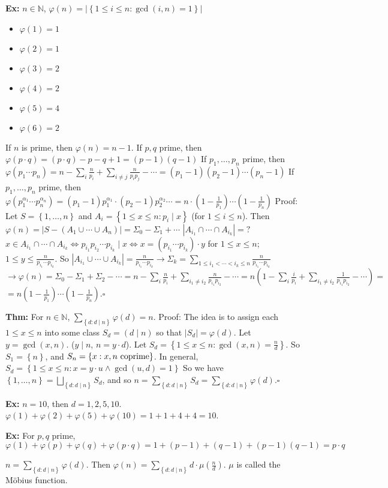 \documentclass[10pt,letterpaper]{article}
\newcommand{\n}{\hfill\break}
\newcommand{\thm}[1]{\par\noindent\settowidth{\hangindent}{\textbf{Thm: }}\textbf{Thm: }#1\n}
\newcommand{\ex}[1]{\par\noindent\settowidth{\hangindent}{\textbf{Ex: }}\textbf{Ex: }#1\n}
\newcommand{\proven}{\;$\square$\n}
\newcommand{\ptxt}[1]{\textrm{\textnormal{#1}}}
\newcommand{\card}[1]{\left|#1\right|}
\newcommand{\set}[1]{\left\{#1\right\}}
\newcommand{\naturals}{\mathbb{N}}
\newcommand{\N}{\naturals}
\newcommand{\divides}{\mid}
\begin{document}
\newpage
\ex{$n\in\N$, $\varphi(n)=\card{\set{1\le{}i\le{}n:\gcd(i,n)=1}}$\n
\begin{itemize}
	\item $\varphi(1)=1$
	\item $\varphi(2)=1$
	\item $\varphi(3)=2$
	\item $\varphi(4)=2$
	\item $\varphi(5)=4$
	\item $\varphi(6)=2$
\end{itemize}\n
If $n$ is prime, then $\varphi(n)=n-1$.\n
If $p,q$ prime, then $\varphi(p\cdot{}q)=(p\cdot{}q)-p-q+1=(p-1)(q-1)$\n
If $p_{1},\ldots,p_{n}$ prime, then $\varphi(p_{1}\cdots{}p_{n})=n-\sum_{i}\frac{n}{p_{i}}+\sum_{i\ne{}j}\frac{n}{p_{i}p_{j}}-\cdots=(p_{1}-1)(p_{2}-1)\cdots(p_{n}-1)$\n
If $p_{1},\ldots,p_{n}$ prime, then $\varphi(p_{1}^{\alpha_{1}}\cdots{}p_{n}^{\alpha_{n}})=(p_{1}-1)p_{1}^{\alpha_{1}}\cdot(p_{2}-1)p_{2}^{\alpha_{2}}\cdots=n\cdot\left(1-\frac{1}{p_{1}}\right)\cdots\left(1-\frac{1}{p_{n}}\right)$\n
\n
Proof: Let $S=\set{1,\ldots,n}$ and $A_{i}=\set{1\le{}x\le{}n:p_{i}\mid{}x}$ (for $1\le{}i\le{}n$).\n
Then $\varphi(n)=\card{S-(A_{1}\cup\cdots\cup{}A_{n})}=\Sigma_{0}-\Sigma_{1}+\cdots$\n
$\card{A_{i_{1}}\cap\cdots\cap{}A_{i_{k}}}=?$\n
$x\in{}A_{i_{1}}\cap\cdots\cap{}A_{i_{k}}\Leftrightarrow{}p_{i_{1}}p_{i_{2}}\cdots{}p_{i_{k}}\mid{}x\Leftrightarrow{}x=(p_{i_{1}}\cdots{}p_{i_{k}})\cdot{}y$ for $1\le{}x\le{}n$; $1\le{}y\le\frac{n}{p_{i_{1}}\cdots{}p_{i_{k}}}$.\n
So $\displaystyle\card{A_{i_{1}}\cup\cdots\cup{}A_{i_{k}}}=\frac{n}{p_{i_{1}}\cdots{}p_{i_{k}}}\to\Sigma_{k}=\sum_{1\le{}i_{1}<\cdots<i_{k}\le{}n}\frac{n}{p_{i_{1}}\cdots{}p_{i_{k}}}$\n
$\to\varphi(n)=\Sigma_{0}-\Sigma_{1}+\Sigma_{2}-\cdots=n-\sum_{i}\frac{n}{p_{i}}+\sum_{i_{1}\ne{}i_{2}}\frac{n}{p_{i_{1}}p_{i_{2}}}-\cdots=n\left(1-\sum_{i}\frac{i}{p_{i}}+\sum_{i_{1}\ne{}i_{2}}\frac{1}{p_{i_{1}}p_{i_{2}}}-\cdots\right)=$\n
$=n\left(1-\frac{1}{p_{1}}\right)\cdots\left(1-\frac{1}{p_{n}}\right)$.\proven}

\thm{For $n\in\N$, $\displaystyle\sum_{\set{d:d\mid{}n}}\varphi(d)=n$.\n
Proof: The idea is to assign each $1\le{}x\le{}n$ into some class $S_{d}=(d\mid{}n)$ so that $\card{S_{d}}=\varphi(d)$.\n
Let $y=\gcd(x,n)$. ($y\divides{}n$, $n=y\cdot{}d$).\n
Let $S_{d}=\set{1\le{}x\le{}n:\gcd(x,n)=\frac{n}{d}}$. So $S_{1}=\set{n}$, and $S_{n}=\set{x:x,n\ptxt{ coprime}}$.\n
In general, $S_{d}=\set{1\le{}x\le{}n:x=y\cdot{}u\land\gcd(u,d)=1}$\n
So we have $\set{1,\ldots,n}=\bigsqcup_{\set{d:d\divides{}n}}S_{d}$, and so $n=\sum_{\set{d:d\divides{}n}}S_{d}=\sum_{\set{d:d\divides{}n}}\varphi(d)$.\proven}

\ex{$n=10$, then $d=1,2,5,10$.\n
$\varphi(1)+\varphi(2)+\varphi(5)+\varphi(10)=1+1+4+4=10$.}

\ex{For $p,q$ prime,\n
$\varphi(1)+\varphi(p)+\varphi(q)+\varphi(p\cdot{}q)=1+(p-1)+(q-1)+(p-1)(q-1)=p\cdot{}q$}

\par\noindent $n=\sum_{\set{d:d\divides{}n}}\varphi(d)$. Then $\varphi(n)=\sum_{\set{d:d\divides{}n}}d\cdot\mu\left(\frac{n}{d}\right)$. $\mu$ is called the M\"obius function.
\end{document}
